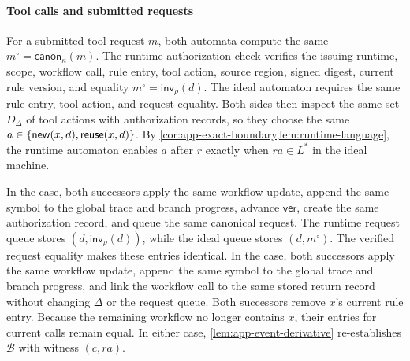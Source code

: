 \paragraph{Tool calls and submitted requests}
For a submitted tool request \(m\), both automata compute the same \(m^\circ=\mathsf{canon}_\kappa(m)\).
The runtime authorization check verifies the issuing runtime, scope, workflow call, rule entry, tool action, source region, signed digest, current rule version, and equality \(m^\circ=\mathsf{inv}_\rho(d)\).
The ideal automaton requires the same rule entry, tool action, and request equality.
Both sides then inspect the same set \(D_\Delta\) of tool actions with authorization records, so they choose the same \(a\in\{\mathsf{new}(x,d),\mathsf{reuse}(x,d)\}\).
By \cref{cor:app-exact-boundary,lem:runtime-language}, the runtime automaton enables \(a\) after \(r\) exactly when \(ra\in L^*\) in the ideal machine.

In the \Fresh case, both successors apply the same workflow update, append the same symbol to the global trace and branch progress, advance \(\mathsf{ver}\), create the same authorization record, and queue the same canonical request.
The runtime request queue stores \((d,\mathsf{inv}_\rho(d))\), while the ideal queue stores \((d,m^\circ)\).
The verified request equality makes these entries identical.
In the \Alias case, both successors apply the same workflow update, append the same symbol to the global trace and branch progress, and link the workflow call to the same stored return record without changing \(\Delta\) or the request queue.
Both successors remove \(x\)'s current rule entry.
Because the remaining workflow no longer contains \(x\), their entries for current calls remain equal.
In either case, \cref{lem:app-event-derivative} re-establishes \(\mathcal B\) with witness \((c,ra)\).

